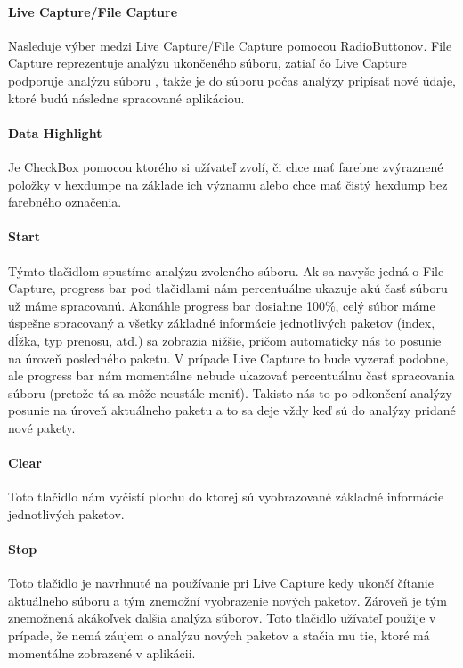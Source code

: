 \paragraph{Live Capture/File Capture}
\hfill\break
Nasleduje výber medzi Live Capture/File Capture pomocou RadioButtonov. File Capture reprezentuje analýzu ukončeného súboru, zatiaľ čo Live Capture podporuje analýzu súboru , takže je do súboru počas analýzy pripísať nové údaje, ktoré budú následne spracované aplikáciou.

\paragraph{Data Highlight}
Je CheckBox pomocou ktorého si užívateľ zvolí, či chce mať farebne zvýraznené položky v hexdumpe na základe ich významu alebo chce mať čistý hexdump bez farebného označenia. 

\paragraph{Start}
\hfill\break
Týmto tlačidlom spustíme analýzu zvoleného súboru. Ak sa navyše jedná o File Capture, progress bar pod tlačidlami nám percentuálne ukazuje akú časť súboru už máme spracovanú. Akonáhle progress bar dosiahne 100\%, celý súbor máme úspešne spracovaný a všetky základné informácie jednotlivých paketov (index, dĺžka, typ prenosu, atď.) sa zobrazia nižšie, pričom automaticky nás to posunie na úroveň posledného paketu. V prípade Live Capture to bude vyzerať podobne, ale progress bar nám momentálne nebude ukazovať percentuálnu časť spracovania súboru (pretože tá sa môže neustále meniť). Takisto nás to po odkončení analýzy posunie na úroveň aktuálneho paketu a to sa deje vždy keď sú do analýzy pridané nové pakety.

\paragraph{Clear}
\hfill\break
Toto tlačidlo nám vyčistí plochu do ktorej sú vyobrazované základné informácie jednotlivých paketov.

\paragraph{Stop}
\hfill\break
Toto tlačidlo je navrhnuté na používanie pri Live Capture kedy ukončí čítanie aktuálneho súboru a tým znemožní vyobrazenie nových paketov. Zároveň je tým znemožnená akákoľvek ďalšia analýza súborov. Toto tlačidlo užívateľ použije v prípade, že nemá záujem o analýzu nových paketov a stačia mu tie, ktoré má momentálne zobrazené v aplikácii.

